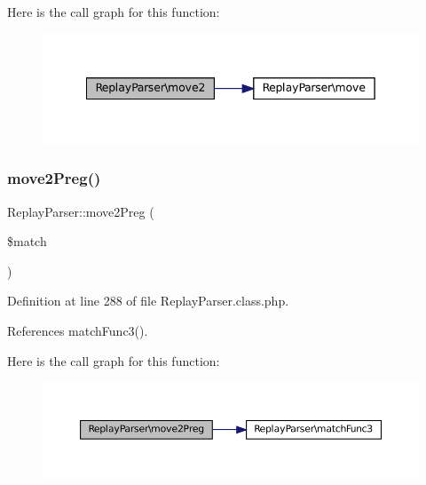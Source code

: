 Here is the call graph for this function\+:\nopagebreak
\begin{figure}[H]
\begin{center}
\leavevmode
\includegraphics[width=342pt]{class_replay_parser_a661a82797d10dec898444269835968a8_cgraph}
\end{center}
\end{figure}
\mbox{\label{class_replay_parser_a2bf5906c71cfd4d61ba347000663f1b0}} 
\subsubsection{\texorpdfstring{move2\+Preg()}{move2Preg()}}
{\footnotesize\ttfamily Replay\+Parser\+::move2\+Preg (\begin{DoxyParamCaption}\item[{}]{\$match }\end{DoxyParamCaption})}



Definition at line 288 of file Replay\+Parser.\+class.\+php.



References match\+Func3().

Here is the call graph for this function\+:\nopagebreak
\begin{figure}[H]
\begin{center}
\leavevmode
\includegraphics[width=350pt]{class_replay_parser_a2bf5906c71cfd4d61ba347000663f1b0_cgraph}
\end{center}
\end{figure}
\mbox{\label{class_replay_parser_a06e573b897046a2755693c8fd923c70b}} 
